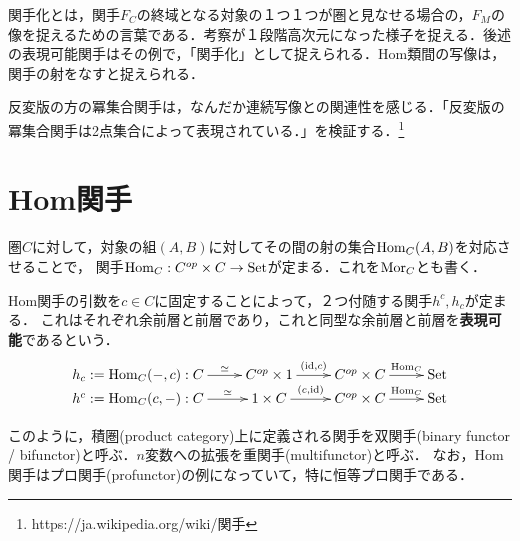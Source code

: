 \documentclass[uplatex, dvipdfmx]{jsreport}
\begin{document}
\begin{screen}
    関手化とは，関手$F_C$の終域となる対象の１つ１つが圏と見なせる場合の，$F_M$の像を捉えるための言葉である．考察が１段階高次元になった様子を捉える．後述の表現可能関手はその例で，「関手化」として捉えられる．Hom類間の写像は，関手の射をなすと捉えられる．
\end{screen}

反変版の方の冪集合関手は，なんだか連続写像との関連性を感じる．「反変版の冪集合関手は2点集合によって表現されている．」を検証する．\footnote{https://ja.wikipedia.org/wiki/関手}


\section{Hom関手}\label{section-hom-functor}

\begin{definition}
    圏$C$に対して，対象の組$(A,B)$に対してその間の射の集合$\mathrm{Hom}_C(A,B)$を対応させることで，
    関手$\mathrm{Hom}_C:C^{op}\times C\to\mathrm{Set}$が定まる．これを$\mathrm{Mor}_C$とも書く．
\end{definition}
\begin{remark}
    Hom関手の引数を$c\in C$に固定することによって，２つ付随する関手$h^c,h_c$が定まる．
    これはそれぞれ余前層と前層であり，これと同型な余前層と前層を\textbf{表現可能}であるという．
    \[\xymatrix@R-2cm{
        h^c:=\Hom_C(c,-):C\ar[r]^-{\simeq}&1\times C\ar[r]^-{(c,\id)}&C^{op}\times C\ar[r]^-{\Hom_C}&\Set\\
        h_c:=\Hom_C(-,c):C\ar[r]^-{\simeq}&C^{op}\times 1\ar[r]^-{(\id,c)}&C^{op}\times C\ar[r]^-{\Hom_C}&\Set
    }\]
\end{remark}
\begin{remark}
    このように，積圏(product category)上に定義される関手を双関手(binary functor / bifunctor)と呼ぶ．$n$変数への拡張を重関手(multifunctor)と呼ぶ．
    なお，Hom関手はプロ関手(profunctor)の例になっていて，特に恒等プロ関手である．
\end{remark}
\end{document}
